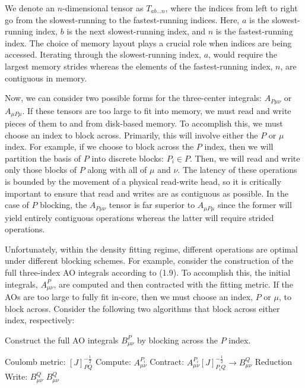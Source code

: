 We denote an $n$-dimensional tensor as $T_{ab\hdots n}$, where the indices from left to right go from the slowest-running
to the fastest-running indices. Here, $a$ is the slowest-running index, $b$ is the next slowest-running
index, and $n$ is the fastest-running index. The choice of memory layout plays a crucial role when indices are being accessed.
Iterating through the slowest-running index, $a$, would require the largest memory strides whereas the elements 
of the fastest-running index, $n$, are contiguous in memory. 

Now, we can consider two possible forms for the three-center integrals: $A_{P\mu\nu}$ or $A_{\mu P\mu}$.
If these tensors are too large to fit into memory, we must read and write pieces of them to and from disk-based memory.
To accomplish this, we must choose an index to block across. Primarily, this will involve either the $P$ or $\mu$ index.
For example, if we choose to block across the $P$ index, then we will partition the basis of $P$ into discrete blocks: $P_i \in P$.
Then, we will read and write only those blocks of $P$ along with all of $\mu$ and $\nu$.
The latency of these operations is
bounded by the movement of a physical read-write head, so it is critically important to ensure that read and writes are as
contiguous as possible. In the case of $P$ blocking, the $A_{P\mu\nu}$ tensor is far superior to $A_{\mu P\mu}$ since the 
former will yield entirely contiguous operations whereas the latter will require strided operations. 

Unfortunately, within the density fitting regime, different operations are optimal under different blocking schemes. For example,
consider the construction of the full three-index AO integrals according to (1.9). To accomplish this, 
the initial integrals, $A_{\mu \nu}^P$, are computed and then contracted with the fitting metric. If the AOs are too large to fully 
fit in-core, then we must choose an index, $P$ or $\mu$, to block across. Consider the following two algorithms
that block across either index, respectively:

\begin{algorithm}[H]
\caption{Construct the full AO integrals $B_{\mu \nu}^P$ by blocking across the $P$ index.}
\begin{algorithmic}
\REQUIRE Coulomb metric: $[J]_{PQ}^{-\frac{1}{2}}$
    \STATE Compute:  $A_{\mu \nu}^{P_i}$
    \STATE Contract: $A_{\mu \nu}^{P_i} [J]_{P_iQ}^{-\frac{1}{2}} \rightarrow B_{\mu \nu}^Q$
    \STATE Reduction Write:    $B_{\mu \nu}^Q$
\ENDFOR
\RETURN $B_{\mu \nu}^Q$
\end{algorithmic}
\end{algorithm}

